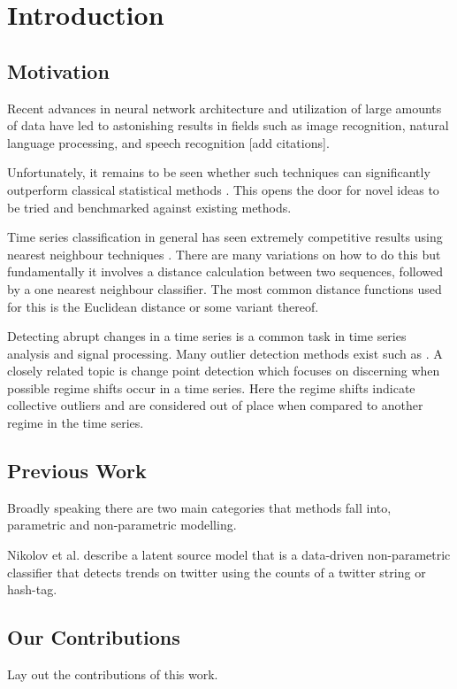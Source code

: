 \chapter{Introduction}
\section{Motivation}
Recent advances in neural network architecture and  utilization of large amounts of data have led to astonishing results in fields such as image recognition, natural language processing, and speech recognition [add citations]. 

Unfortunately, it remains to be seen whether such techniques can significantly outperform classical statistical methods \cite{makridakis2018statistical}. This opens the door for novel ideas to be tried and benchmarked against existing methods. 

Time series classification in general has seen extremely competitive results using nearest neighbour techniques \cite{bagnall2017great}. There are many variations on how to do this but fundamentally it involves a distance calculation between two sequences, followed by a one nearest neighbour classifier. The most common distance functions used for this is the Euclidean distance or some variant thereof. 


Detecting abrupt changes in a time series is a common task in time series analysis and signal processing. Many outlier detection methods exist such as . A closely related topic is change point detection which focuses on discerning  when possible regime shifts occur in a time series. Here the regime shifts indicate collective outliers and are considered out of place when compared to another regime in the time series.

\section{Previous Work}
Broadly speaking there are two main categories that methods fall into, parametric and non-parametric modelling. 

Nikolov et al. describe a latent source model that is a data-driven non-parametric classifier that detects trends on twitter using the counts of a twitter string or hash-tag. 

\section{Our Contributions}
Lay out the contributions of this work.